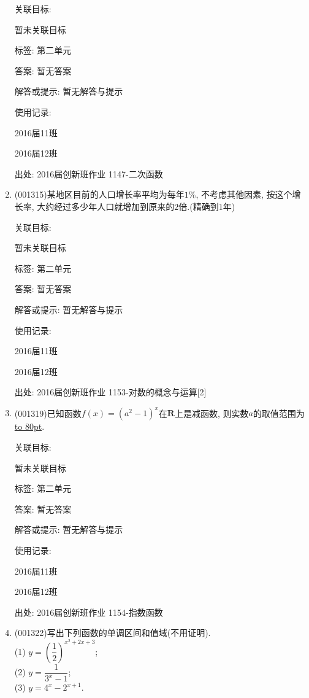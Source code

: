\documentclass[10pt,a4paper]{article}
\newcommand{\blank}[1]{\underline{\hbox to #1pt{}}}
\begin{document}
\begin{enumerate}[1.]
关联目标:

暂未关联目标



标签: 第二单元

答案: 暂无答案

解答或提示: 暂无解答与提示

使用记录:

2016届11班	

2016届12班	


出处: 2016届创新班作业	1147-二次函数
\item { (001315)}某地区目前的人口增长率平均为每年$1\%$, 不考虑其他因素, 按这个增长率, 大约经过多少年人口就增加到原来的$2$倍.(精确到$1$年)


关联目标:

暂未关联目标



标签: 第二单元

答案: 暂无答案

解答或提示: 暂无解答与提示

使用记录:

2016届11班	

2016届12班	


出处: 2016届创新班作业	1153-对数的概念与运算[2]
\item { (001319)}已知函数$f(x)=(a^2-1)^x$在$\mathbf{R}$上是减函数, 则实数$a$的取值范围为\blank{80}.


关联目标:

暂未关联目标



标签: 第二单元

答案: 暂无答案

解答或提示: 暂无解答与提示

使用记录:

2016届11班	

2016届12班	


出处: 2016届创新班作业	1154-指数函数
\item { (001322)}写出下列函数的单调区间和值域(不用证明).\\ 
(1) $y=\left(\dfrac{1}{2}\right)^{x^2+2x+3}$;\\ 
(2) $y=\dfrac{1}{3^x-1}$;\\ 
(3) $y=4^x-2^{x+1}$.



\end{enumerate}
\end{document}
